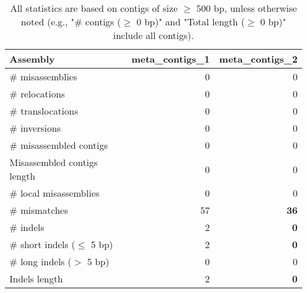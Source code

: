 \documentclass[12pt,a4paper]{article}
\begin{document}
\begin{table}[ht]
\begin{center}
\caption{All statistics are based on contigs of size $\geq$ 500 bp, unless otherwise noted (e.g., "\# contigs ($\geq$ 0 bp)" and "Total length ($\geq$ 0 bp)" include all contigs).}
\begin{tabular}{|l*{2}{|r}|}
\hline
Assembly & meta\_contigs\_1 & meta\_contigs\_2 \\ \hline
\# misassemblies & 0 & 0 \\ \hline
\hspace{5mm}\# relocations & 0 & 0 \\ \hline
\hspace{5mm}\# translocations & 0 & 0 \\ \hline
\hspace{5mm}\# inversions & 0 & 0 \\ \hline
\# misassembled contigs & 0 & 0 \\ \hline
Misassembled contigs length & 0 & 0 \\ \hline
\# local misassemblies & 0 & 0 \\ \hline
\# mismatches & 57 & {\bf 36} \\ \hline
\# indels & 2 & {\bf 0} \\ \hline
\hspace{5mm}\# short indels ($\leq$ 5 bp) & 2 & {\bf 0} \\ \hline
\hspace{5mm}\# long indels ($>$ 5 bp) & 0 & 0 \\ \hline
Indels length & 2 & {\bf 0} \\ \hline
\end{tabular}
\end{center}
\end{table}
\end{document}
